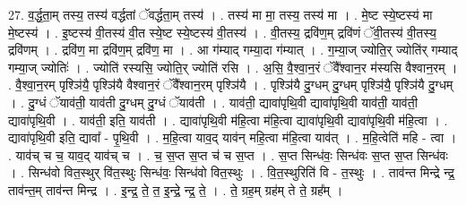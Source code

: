 \documentclass[17pt]{extarticle}
\begin{document}
27. व॒र्द्ध॒ता॒म् तस्य॒ तस्य॑ वर्द्धतां ॅवर्द्धता॒म् तस्य॑ । . तस्य॑ मा मा॒ तस्य॒ तस्य॑ मा । . मे॒ष्ट स्ये॒ष्टस्य॑ मा मे॒ष्टस्य॑ । . इ॒ष्टस्य॑ वी॒तस्य॑ वी॒त स्ये॒ष्ट स्ये॒ष्टस्य॑ वी॒तस्य॑ । . वी॒तस्य॒ द्रवि॑ण॒म् द्रवि॑णं ॅवी॒तस्य॑ वी॒तस्य॒ द्रवि॑णम् । . द्रवि॑ण॒ मा द्रवि॑ण॒म् द्रवि॑ण॒ मा । . आ ग॑म्याद् गम्या॒दा ग॑म्यात् । . ग॒म्या॒ज् ज्योति॒र् ज्योति॑र् गम्याद् गम्या॒ज् ज्योतिः॑ । . ज्योति॑ रस्यसि॒ ज्योति॒र् ज्योति॑ रसि । . अ॒सि॒ वै॒श्वा॒न॒रं ॅवै᳚श्वान॒र म॑स्यसि वैश्वान॒रम् । . वै॒श्वा॒न॒रम् पृश्ञि॑यै॒ पृश्ञि॑यै वैश्वान॒रं ॅवै᳚श्वान॒रम् पृश्ञि॑यै । . पृश्ञि॑यै दु॒ग्धम् दु॒ग्धम् पृश्ञि॑यै॒ पृश्ञि॑यै दु॒ग्धम् । . दु॒ग्धं ॅयाव॑ती॒ याव॑ती दु॒ग्धम् दु॒ग्धं ॅयाव॑ती । . याव॑ती॒ द्यावा॑पृथि॒वी द्यावा॑पृथि॒वी याव॑ती॒ याव॑ती॒ द्यावा॑पृथि॒वी । . याव॑ती॒ इति॒ याव॑ती । . द्यावा॑पृथि॒वी म॑हि॒त्वा म॑हि॒त्वा द्यावा॑पृथि॒वी द्यावा॑पृथि॒वी म॑हि॒त्वा । . द्यावा॑पृथि॒वी इति॒ द्यावा᳚ - पृ॒थि॒वी । . म॒हि॒त्वा याव॒द् याव॑न् महि॒त्वा म॑हि॒त्वा याव॑त् । . म॒हि॒त्वेति॑ महि - त्वा । . याव॑च् च च॒ याव॒द् याव॑च् च । . च॒ स॒प्त स॒प्त च॑ च स॒प्त । . स॒प्त सिन्ध॑वः॒ सिन्ध॑वः स॒प्त स॒प्त सिन्ध॑वः । . सिन्ध॑वो वित॒स्थुर् वि॑त॒स्थुः सिन्ध॑वः॒ सिन्ध॑वो वित॒स्थुः । . वि॒त॒स्थुरिति॑ वि - त॒स्थुः । . ताव॑न्त मिन्द्रे न्द्र॒ ताव॑न्त॒म् ताव॑न्त मिन्द्र । . इ॒न्द्र॒ ते॒ त॒ इ॒न्द्रे॒ न्द्र॒ ते॒ । . ते॒ ग्रह॒म् ग्रह॑म् ते ते॒ ग्रह᳚म् । \newline
\end{document}
